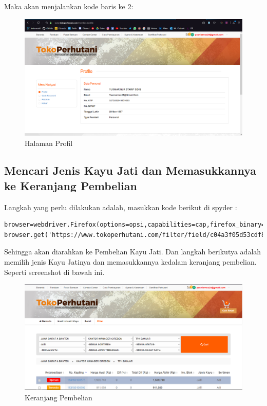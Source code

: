 Maka akan menjalankan kode baris ke 2:
\begin{figure}[h]
	\centering
	\includegraphics[scale=0.25]{figures/735profilektp}
	\caption{Halaman Profil}
\end{figure}

\newpage
\subsection {Mencari Jenis Kayu Jati dan Memasukkannya ke Keranjang Pembelian}
Langkah yang perlu dilakukan adalah, masukkan kode berikut di spyder :
\begin{verbatim}
browser=webdriver.Firefox(options=opsi,capabilities=cap,firefox_binary=binary)
browser.get('https://www.tokoperhutani.com/filter/field/c04a3f05d53cdf8f8ac5cf643ba2504bd2f46bd0bb9a60877d640d51d96a6af5#')
\end{verbatim}

Sehingga akan diarahkan ke Pembelian Kayu Jati. Dan langkah berikutya adalah memilih jenis Kayu Jatinya dan memasukkannya kedalam keranjang pembelian. Seperti screenshot di bawah ini.
\begin{figure}[h]
	\centering
	\includegraphics[scale=0.25]{figures/T5_cart}
	\caption{Keranjang Pembelian}
\end{figure}

